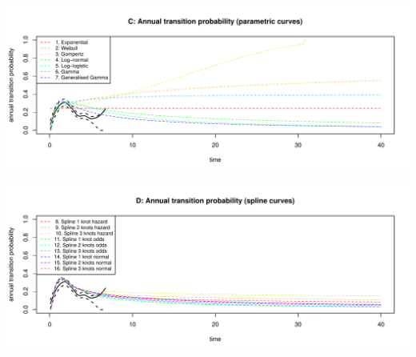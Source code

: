 \documentclass[
]{article}
\begin{document}
\begin{flushleft}\includegraphics[height=0.29\textheight]{Images/validate_extrapolation3-3} \end{flushleft}

\begin{flushleft}\includegraphics[height=0.29\textheight]{Images/validate_extrapolation3-4} \end{flushleft}
\end{document}
